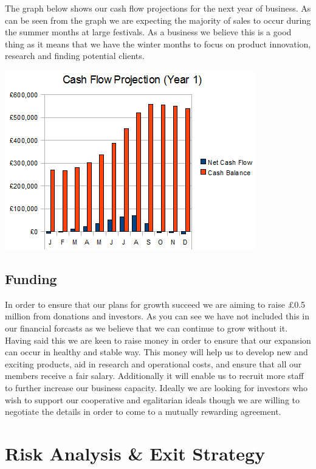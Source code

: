 \documentclass{article}
\begin{document}
The graph below shows our cash flow projections for the next year of business. As can be seen from the graph we are expecting the majority of sales to occur during the summer months at large festivals. As a business we believe this is a good thing as it means that we have the winter months to focus on product innovation, research and finding potential clients.
\begin{center}
\includegraphics[scale=1.0]{cashFlowYear1.png}
\end{center}

\subsection{Funding}

In order to ensure that our plans for growth succeed we are aiming to raise \pounds 0.5 million from donations and investors. As you can see we have not included this in our financial forcasts as we believe that we can continue to grow without it. Having said this we are keen to raise money in order to ensure that our expansion can occur in healthy and stable way. This money will help us to develop new and exciting products, aid in research and operational costs, and ensure that all our members receive a fair salary. Additionally it will enable us to recruit more staff to further increase our business capacity. Ideally we are looking for investors who wish to support our cooperative and egalitarian ideals though we are willing to negotiate the details in order to come to a mutually rewarding agreement.

\section{Risk Analysis \& Exit Strategy}
\end{document}

